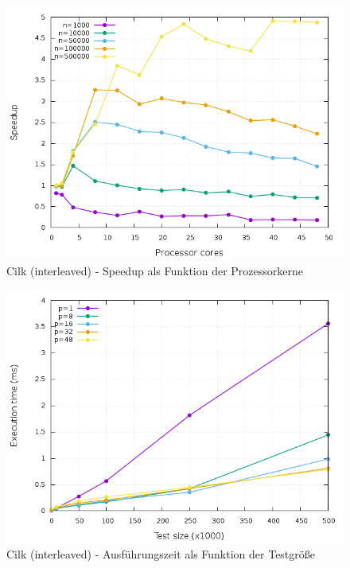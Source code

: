 \begin{figure}[p]
	\centering
	\includegraphics[width=404pt]{resources/plots/Cilk_Interleaved_sizes.png}
	\caption{Cilk (interleaved) - Speedup als Funktion der Prozessorkerne}
	\label{Cilk_Interleaved_sizes}
\end{figure}

\begin{figure}[p]
	\centering
	\includegraphics[width=404pt]{resources/plots/Cilk_Interleaved_cores.png}
	\caption{Cilk (interleaved) - Ausführungszeit als Funktion der Testgröße}
	\label{Cilk_Interleaved_cores}
\end{figure}



